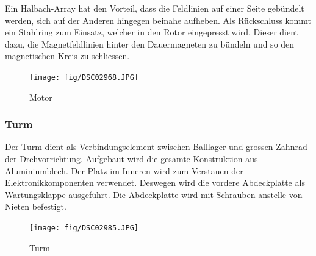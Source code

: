 \noindent
Ein Halbach-Array hat den Vorteil, dass die Feldlinien auf einer 
Seite gebündelt werden, sich auf der Anderen hingegen beinahe aufheben. 
Als Rückschluss kommt ein Stahlring zum Einsatz, welcher in den Rotor 
eingepresst wird. Dieser dient dazu, die Magnetfeldlinien hinter den 
Dauermagneten zu bündeln und so den magnetischen Kreis zu schliessen. 

\begin{figure}[h!]
    \centering
    \texttt{[image: fig/DSC02968.JPG]}
    \caption{Motor}
    \label{fig:motor}
\end{figure}

\subsubsection{Turm}
Der Turm dient als Verbindungselement zwischen Balllager und grossen Zahnrad 
der Drehvorrichtung. Aufgebaut wird die gesamte Konstruktion aus 
Aluminiumblech. Der Platz im Inneren wird zum Verstauen der 
Elektronikkomponenten verwendet. Deswegen wird die vordere Abdeckplatte als 
Wartungsklappe ausgeführt. Die Abdeckplatte wird mit Schrauben anstelle von 
Nieten befestigt.

\begin{figure}[h!]
    \centering
    \texttt{[image: fig/DSC02985.JPG]}
    \caption{Turm}
    \label{fig:turm}
\end{figure}
